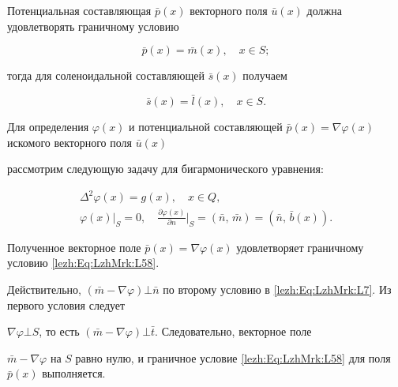 Потенциальная составляющая $\bar{p}(x)$ векторного поля $\bar{u}(x)$ должна удовлетворять граничному условию

\begin{equation}

   \label{lezh:Eq:LzhMrk:L58}

   \bar{p}(x) = \bar{m}(x), \quad  x \in S;

\end{equation}

тогда для соленоидальной составляющей $\bar{s}(x)$ получаем

\begin{equation}

   \label{lezh:Eq:LzhMrk:L59}

   \bar{s}(x) = \bar{l}(x), \quad x \in S.

\end{equation}



Для определения $\varphi(x)$ и потенциальной составляющей $\bar{p}(x) = \nabla \varphi (x)$ искомого векторного поля $\bar{u}(x)$

рассмотрим следующую задачу для бигармонического уравнения:

\begin{gather}

   \label{lezh:Eq:LzhMrk:L6}

   \Delta^2 \varphi(x) = g(x), \quad x \in Q,\\

   \label{lezh:Eq:LzhMrk:L7}

   \varphi(x)\big|_S = 0, \quad \frac{\partial \varphi(x)}{\partial n}\Big|_S = (\bar{n},\,\bar{m})=(\bar{n},\,\bar{b}(x)).

\end{gather}



Полученное векторное поле $\bar{p}(x) = \nabla \varphi (x)$ удовлетворяет граничному условию \eqref{lezh:Eq:LzhMrk:L58}.

Действительно, $(\bar{m}-\nabla \varphi )\bot \bar{n}$ по второму условию в \eqref{lezh:Eq:LzhMrk:L7}. Из первого условия следует

 $\nabla \varphi \bot S$, то есть $(\bar{m}-\nabla \varphi )\bot \bar{t}$. Следовательно, векторное поле

$\bar{m}-\nabla \varphi$ на $S$ равно нулю, и граничное условие \eqref{lezh:Eq:LzhMrk:L58} для поля $\bar{p}(x)$ выполняется.



